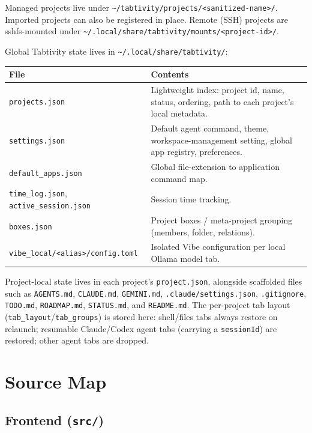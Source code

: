 \documentclass[11pt,a4paper]{article}
\newcommand{\code}[1]{\texttt{#1}}
\begin{document}
Managed projects live under
\code{\textasciitilde/tabtivity/projects/<sanitized-name>/}. Imported projects can
also be registered in place. Remote (SSH) projects are sshfs-mounted under
\code{\textasciitilde/.local/share/tabtivity/mounts/<project-id>/}.

\noindent Global Tabtivity state lives in
\code{\textasciitilde/.local/share/tabtivity/}:

\begin{longtable}{@{}p{4.8cm}p{9.8cm}@{}}
\toprule
\textbf{File} & \textbf{Contents} \\
\midrule
\endhead
\code{projects.json}        & Lightweight index: project id, name, status, ordering, path to each project's local metadata. \\
\code{settings.json}        & Default agent command, theme, workspace-management setting, global app registry, preferences. \\
\code{default\_apps.json}   & Global file-extension to application command map. \\
\code{time\_log.json}, \code{active\_session.json} & Session time tracking. \\
\code{boxes.json}           & Project boxes / meta-project grouping (members, folder, relations). \\
\code{vibe\_local/<alias>/config.toml} & Isolated Vibe configuration per local Ollama model tab. \\
\bottomrule
\end{longtable}

Project-local state lives in each project's \code{project.json}, alongside
scaffolded files such as \code{AGENTS.md}, \code{CLAUDE.md}, \code{GEMINI.md},
\code{.claude/settings.json}, \code{.gitignore}, \code{TODO.md},
\code{ROADMAP.md}, \code{STATUS.md}, and \code{README.md}. The per-project tab
layout (\code{tab\_layout}/\code{tab\_groups}) is stored here: shell/files tabs
always restore on relaunch; resumable Claude/Codex agent tabs (carrying a
\code{sessionId}) are restored; other agent tabs are dropped.

\section{Source Map}

\subsection{Frontend (\code{src/})}
\end{document}

